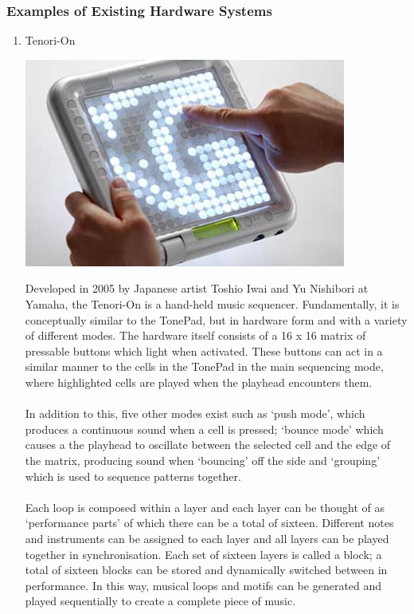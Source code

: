 \documentclass[10pt,a4paper]{article}
\begin{document}
\subsubsection{Examples of Existing Hardware Systems}
\begin{enumerate}
\item Tenori-On
\begin{center}
\includegraphics[scale=0.5]{3.jpg}\
\end{center}
Developed in 2005 by Japanese artist Toshio Iwai and Yu Nishibori at Yamaha\cite{tenorionwiki}, the Tenori-On is a hand-held music sequencer. Fundamentally, it is conceptually similar to the TonePad, but in hardware form and with a variety of different modes. The hardware itself consists of a 16 x 16 matrix of pressable buttons which light when activated. These buttons can act in a similar manner to the cells in the TonePad in the main sequencing mode, where highlighted cells are played when the playhead encounters them.\\
\\
In addition to this, five other modes exist such as `push mode’, which produces a continuous sound when a cell is pressed; `bounce mode’ which causes a the playhead to oscillate between the selected cell and the edge of the matrix, producing sound when `bouncing’ off the side and `grouping’ which is used to sequence patterns together.\\
\\
Each loop is composed within a layer and each layer can be thought of as `performance parts' of which there can be a total of sixteen. Different notes and instruments can be assigned to each layer and all layers can be played together in synchronisation. Each set of sixteen layers is called a block; a total of sixteen blocks can be stored and dynamically switched between in performance. In this way, musical loops and motifs can be generated and played sequentially to create a complete piece of music\cite{tenorionyamaha}.


\end{enumerate}
\end{document}
